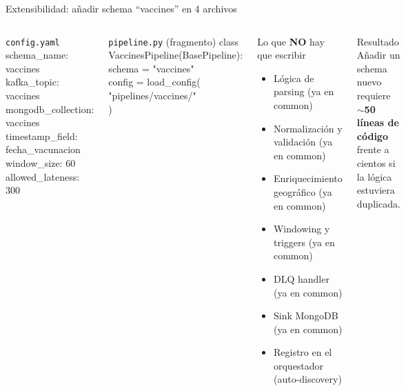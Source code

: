 \documentclass[aspectratio=169, 10pt]{beamer}
\begin{document}
\begin{frame}[shrink=5]{Extensibilidad: a\~nadir schema ``vaccines'' en 4 archivos}
  \begin{columns}[t]
      \begin{exampleblock}{\texttt{config.yaml}}
        {\footnotesize\ttfamily
        schema\_name: vaccines\\
        kafka\_topic: vaccines\\
        mongodb\_collection: vaccines\\
        timestamp\_field: fecha\_vacunacion\\
        window\_size: 60\\
        allowed\_lateness: 300
        }
      \end{exampleblock}
      \vspace{4pt}
      \begin{exampleblock}{\texttt{pipeline.py} (fragmento)}
        {\footnotesize\ttfamily
        class VaccinesPipeline(BasePipeline):\\
        \hspace{8pt}schema = "vaccines"\\
        \hspace{8pt}config = load\_config(\\
        \hspace{16pt}"pipelines/vaccines/"\\
        \hspace{8pt})
        }
      \end{exampleblock}
      \begin{block}{Lo que \textbf{NO} hay que escribir}
        \begin{itemize}\setlength\itemsep{3pt}
          \item L\'ogica de parsing (ya en common)
          \item Normalizaci\'on y validaci\'on (ya en common)
          \item Enriquecimiento geogr\'afico (ya en common)
          \item Windowing y triggers (ya en common)
          \item DLQ handler (ya en common)
          \item Sink MongoDB (ya en common)
          \item Registro en el orquestador (auto-discovery)
        \end{itemize}
      \end{block}
      \vspace{4pt}
      \begin{alertblock}{Resultado}
        \small
        A\~nadir un schema nuevo requiere \textbf{$\sim$50 l\'ineas de c\'odigo}
        frente a cientos si la l\'ogica estuviera duplicada.
      \end{alertblock}
  \end{columns}
\end{frame}
\end{document}
